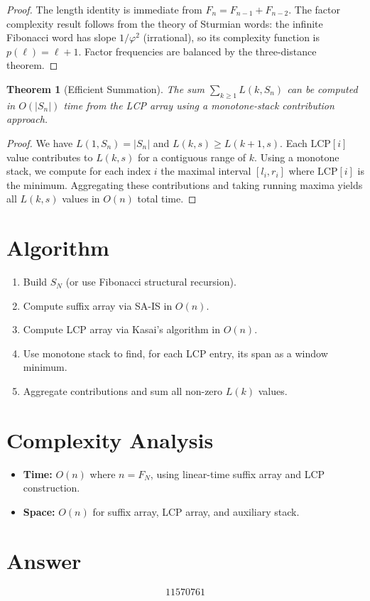 \documentclass[11pt]{article}
\newtheorem{theorem}{Theorem}
\begin{document}
\begin{proof}
The length identity is immediate from $F_n = F_{n-1} + F_{n-2}$. The factor complexity result follows from the theory of Sturmian words: the infinite Fibonacci word has slope $1/\varphi^2$ (irrational), so its complexity function is $p(\ell) = \ell + 1$. Factor frequencies are balanced by the three-distance theorem.
\end{proof}

\begin{theorem}[Efficient Summation]
The sum $\sum_{k \geq 1} L(k, S_n)$ can be computed in $O(|S_n|)$ time from the LCP array using a monotone-stack contribution approach.
\end{theorem}

\begin{proof}
We have $L(1, S_n) = |S_n|$ and $L(k, s) \geq L(k+1, s)$. Each $\mathrm{LCP}[i]$ value contributes to $L(k,s)$ for a contiguous range of $k$. Using a monotone stack, we compute for each index $i$ the maximal interval $[l_i, r_i]$ where $\mathrm{LCP}[i]$ is the minimum. Aggregating these contributions and taking running maxima yields all $L(k,s)$ values in $O(n)$ total time.
\end{proof}

\section{Algorithm}

\begin{enumerate}
    \item Build $S_N$ (or use Fibonacci structural recursion).
    \item Compute suffix array via SA-IS in $O(n)$.
    \item Compute LCP array via Kasai's algorithm in $O(n)$.
    \item Use monotone stack to find, for each LCP entry, its span as a window minimum.
    \item Aggregate contributions and sum all non-zero $L(k)$ values.
\end{enumerate}

\section{Complexity Analysis}

\begin{itemize}
    \item \textbf{Time:} $O(n)$ where $n = F_N$, using linear-time suffix array and LCP construction.
    \item \textbf{Space:} $O(n)$ for suffix array, LCP array, and auxiliary stack.
\end{itemize}

\section{Answer}

\[
\boxed{11570761}
\]
\end{document}
